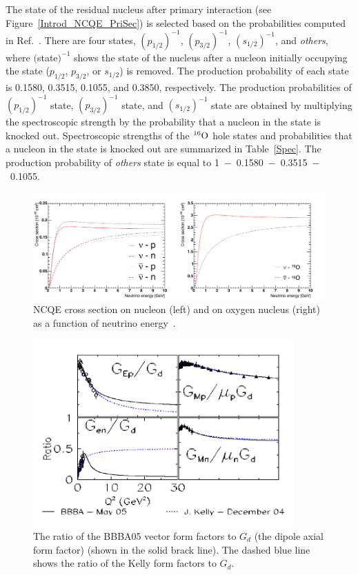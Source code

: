 \hs
The state of the residual nucleus after primary interaction (see Figure~\ref{Introd_NCQE_PriSec}) is selected based on the probabilities computed in Ref.~\cite{2012Ankowski}.
There are four states, $(p_{1/2})^{-1}$, $(p_{3/2})^{-1}$, $(s_{1/2})^{-1}$, and \textit{others}, where $($state$)^{-1}$ shows the state of the nucleus after a nucleon initially occupying the state ($p_{1/2}$, $p_{3/2}$, or $s_{1/2}$) is removed.
The production probability of each state is 0.1580, 0.3515, 0.1055, and 0.3850, respectively.
The production probabilities of $(p_{1/2})^{-1}$ state, $(p_{3/2})^{-1}$ state, and $(s_{1/2})^{-1}$ state are obtained by multiplying the spectroscopic strength by the probability that a nucleon in the state is knocked out.
Spectroscopic strengths of the $^{16}{\rm O}$ hole states and probabilities that a nucleon in the state is knocked out are summarized in Table~\ref{Spec}.
The production probability of \textit{others} state is equal to 1~$-$~0.1580~$-$~0.3515~$-$~0.1055.

\begin{figure}[H]
	\centering
	\includegraphics[width=16cm]{Figures/Simulation/NCQECroSec}
	\caption[NCQE cross section on nucleon and on oxygen nucleus as a function of neutrino energy]{
	NCQE cross section on nucleon (left) and on oxygen nucleus (right) as a function of neutrino energy~\cite{2012Ankowski}.
	}\label{Simula_NCQECroSec}
\end{figure}

\begin{figure}[H]
	\centering
	\includegraphics[width=10cm]{Figures/Simulation/BBBA05}
	\caption[The ratio of the BBBA05 vector form factors to $G_{d}$]{
	The ratio of the BBBA05 vector form factors to $G_{d}$ (the dipole axial form factor) (shown in the solid brack line)\cite{2006Bradford}.
	The dashed blue line shows the ratio of the Kelly form factors to $G_{d}$.
	}\label{BBBA05}
\end{figure}

